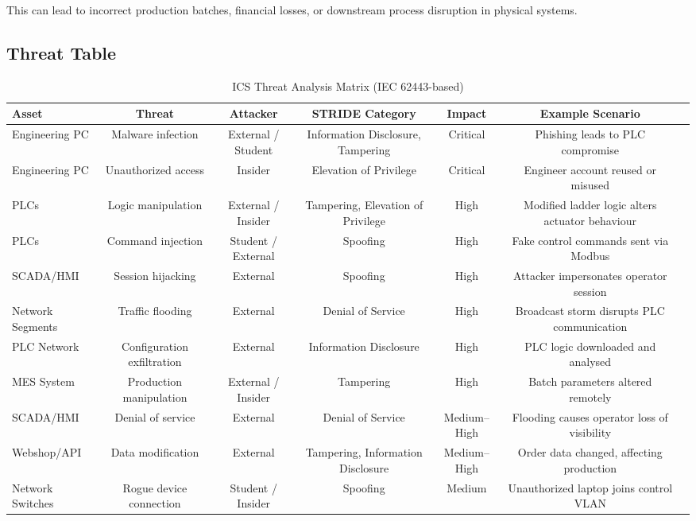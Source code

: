This can lead to incorrect production batches, financial losses, or downstream process disruption in physical systems.

\subsection{Threat Table}

\begin{table}[h!]
\centering
\begin{adjustbox}{max width=\textwidth}
\begin{tabular}{@{}lcccccl@{}}
\toprule
\textbf{Asset} & \textbf{Threat} & \textbf{Attacker} & \textbf{STRIDE Category} & \textbf{Impact} & \textbf{Example Scenario} \\
\midrule
Engineering PC & Malware infection & External / Student & Information Disclosure, Tampering & Critical & Phishing leads to PLC compromise \\
Engineering PC & Unauthorized access & Insider & Elevation of Privilege & Critical & Engineer account reused or misused \\
PLCs & Logic manipulation & External / Insider & Tampering, Elevation of Privilege & High & Modified ladder logic alters actuator behaviour \\
PLCs & Command injection & Student / External & Spoofing & High & Fake control commands sent via Modbus \\
SCADA/HMI & Session hijacking & External & Spoofing & High & Attacker impersonates operator session \\
Network Segments & Traffic flooding & External & Denial of Service & High & Broadcast storm disrupts PLC communication \\
PLC Network & Configuration exfiltration & External & Information Disclosure & High & PLC logic downloaded and analysed \\
MES System & Production manipulation & External / Insider & Tampering & High & Batch parameters altered remotely \\
SCADA/HMI & Denial of service & External & Denial of Service & Medium–High & Flooding causes operator loss of visibility \\
Webshop/API & Data modification & External & Tampering, Information Disclosure & Medium–High & Order data changed, affecting production \\
Network Switches & Rogue device connection & Student / Insider & Spoofing & Medium & Unauthorized laptop joins control VLAN \\
\bottomrule
\end{tabular}
\end{adjustbox}
\caption{ICS Threat Analysis Matrix (IEC 62443-based)}
\end{table}
